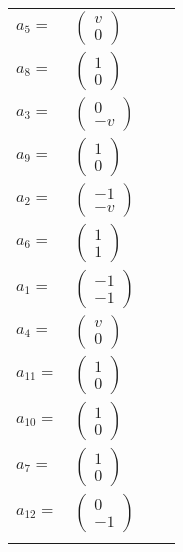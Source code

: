 \documentclass[1p]{elsarticle_modified}
\theoremstyle{definition}
\begin{document}
\begin{tabular}{m{7pt} m{180pt} m{7pt} m{180pt} }
\flushright $a_{5}=$&$\begin{pmatrix}v\\0\end{pmatrix}$ \\
\flushright $a_{8}=$&$\begin{pmatrix}1\\0\end{pmatrix}$ \\
\flushright $a_{3}=$&$\begin{pmatrix}0\\- v\end{pmatrix}$ \\
\flushright $a_{9}=$&$\begin{pmatrix}1\\0\end{pmatrix}$ \\
\flushright $a_{2}=$&$\begin{pmatrix}-1\\- v\end{pmatrix}$ \\
\flushright $a_{6}=$&$\begin{pmatrix}1\\1\end{pmatrix}$ \\
\flushright $a_{1}=$&$\begin{pmatrix}-1\\-1\end{pmatrix}$ \\
\flushright $a_{4}=$&$\begin{pmatrix}v\\0\end{pmatrix}$ \\
\flushright $a_{11}=$&$\begin{pmatrix}1\\0\end{pmatrix}$ \\
\flushright $a_{10}=$&$\begin{pmatrix}1\\0\end{pmatrix}$ \\
\flushright $a_{7}=$&$\begin{pmatrix}1\\0\end{pmatrix}$ \\
\flushright $a_{12}=$&$\begin{pmatrix}0\\-1\end{pmatrix}$\\&\end{tabular}
\end{document}
